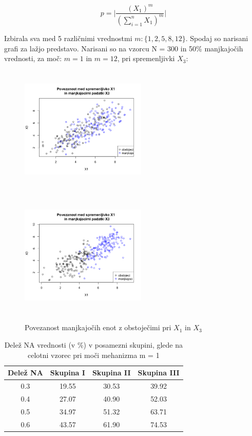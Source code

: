 \documentclass[12pt,a4paper]{article}
\begin{document}
$$p = \big| \frac{(X_1)^m}{(\sum_{i=1}^{n}X_1)^m} \big| $$


\noindent Izbirala sva med 5 različnimi vrednostmi $m: \{1, 2, 5, 8, 12  \}$. Spodaj so narisani grafi za lažjo predstavo. Narisani so na vzorcu N = 300 in 50\% manjkajočih vrednosti, za moč: $m = 1$  in $m= 12$, pri spremenljivki $X_3$:

\begin{figure}[ht]
	\centering
	\begin{minipage}[b]{.5\linewidth}	
		\centering
		\includegraphics[width= 6cm, height = 6cm]{img/MAR_moc_1.png}
		\label{fig:1a}
	\end{minipage}%
	\begin{minipage}[b]{.5\linewidth}
		\centering
		\includegraphics[width= 6cm, height = 6cm]{img/MAR_moc_12.png}
		\label{fig:1b}
	\end{minipage}
	\caption{Povezanost manjkajočih enot z obstoječimi pri $X_1$ in $X_3$}
	\label{fig:1}
\end{figure}

\begin{table}[ht]
	\centering
	\begin{tabular}{cccc}
		Delež NA & Skupina I & Skupina II  &  Skupina III  \\
		\hline
     0.3 & 19.55 & 30.53 & 39.92\\
     0.4 & 27.07 & 40.90 & 52.03\\
     0.5 & 34.97 & 51.32 & 63.71\\
     0.6 & 43.57 & 61.90 & 74.53\\
	\end{tabular}
	\caption{Delež NA vrednosti (v \%) v posamezni skupini, glede na celotni vzorec pri moči mehanizma m = 1}
	\label{tab:1}
\end{table}
\end{document}
